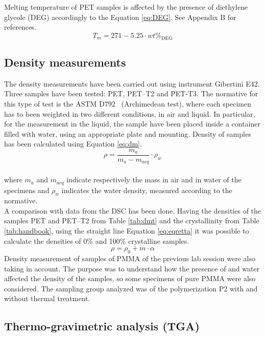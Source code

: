 \documentclass[a4paper, 11pt]{article}
\begin{document}
Melting temperature of PET samples is affected by the presence of diethylene glycole (DEG) accordingly to the Equation \ref{eq:DEG}. See Appendix B for references.
\begin{equation}
T_m = 271-5.25\cdot wt\%_\text{DEG}
\label{eq:DEG}
\end{equation}

\subsection{Density measurements}

The density measurements have been carried out using instrument Gibertini E42. Three samples have been tested: PET, PET–T2 and PET-T3. The normative for this type of test is the ASTM D792~\cite{densità} (Archimedean test), where each specimen has to been weighted in two different conditions, in air and liquid. In particular, for the measurement in the liquid, the sample have been placed inside a container filled with water, using an appropriate plate and mounting. Density of samples has been calculated using Equation \ref{eq:dm}.
\begin{equation}
\rho=\frac{m_{a}}{m_{a}-m_{acq}}\cdot\rho_{w}
\label{eq:dm}
\end{equation}\\
where $m_{a}$ and $m_{acq}$ indicate respectively the mass in air and in water of the specimens and $\rho_{w}$ indicates the water density, measured according to the normative.\\
A comparison with data from the DSC has been done. Having the densities of the samples PET and PET–T2 from Table \ref{tab:dmt} and the crystallinity from Table \ref{tab:handbook}, using the straight line Equation \ref{eq:eqretta} it was possible to calculate the densities of 0\% and 100\% crystalline samples.
\begin{equation}
\rho=\rho_{0}+m\cdot\alpha
\label{eq:eqretta}
\end{equation}
Density measurement of samples of PMMA of the previous lab session were also taking in account. The purpose was to understand how the presence of  and water affected the density of the samples, so some specimens of pure PMMA were also considered. The sampling group analyzed was of the polymerization P2 with and without thermal treatment.

\subsection{Thermo-gravimetric analysis (TGA)}
\end{document}

